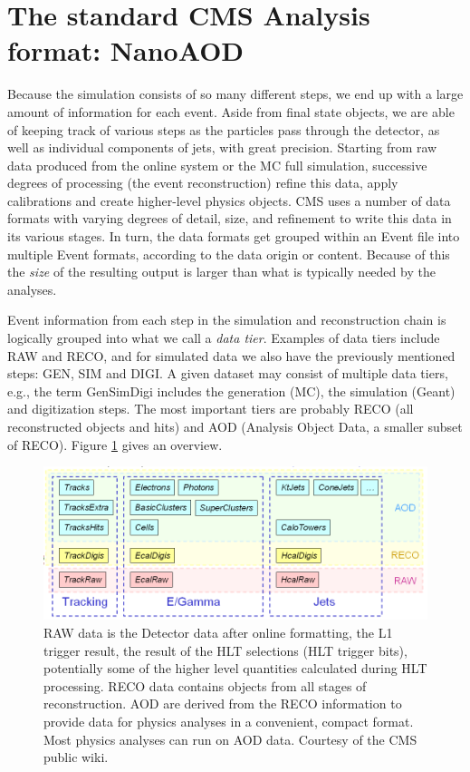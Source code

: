 \section{The standard CMS Analysis format: NanoAOD}\label{sec:nanoaod}

Because the simulation consists of so many different steps, we end up with a large amount of information for each event. Aside from final state objects, we are able of keeping track of various steps as the particles pass through the detector, as well as individual components of jets, with great precision. Starting from raw data produced from the online system or the MC full simulation, successive degrees of processing (the event reconstruction) refine this data, apply calibrations and create higher-level physics objects. CMS uses a number of data formats with varying degrees of detail, size, and refinement to write this data in its various stages. In turn, the data formats get grouped within an Event file into multiple Event formats, according to the data origin or content. Because of this the \emph{size} of the resulting output is larger than what is typically needed by the analyses.

Event information from each step in the simulation and reconstruction chain is logically grouped into what we call a \emph{data tier}. Examples of data tiers include RAW and RECO, and for simulated data we also have the previously mentioned steps: GEN, SIM and DIGI. A given dataset may consist of multiple data tiers, e.g., the term GenSimDigi includes the generation (MC), the simulation (Geant) and digitization steps. The most important tiers are probably RECO (all reconstructed objects and hits) and AOD (Analysis Object Data, a smaller subset of RECO). Figure \ref{fig:datatier} gives an overview. 

\begin{figure}
    \centering
     \includegraphics[width=\columnwidth]{gfx/ch2/whats_in_aod_reco.png}
    \caption[Data Tiers]{RAW data is the Detector data after online formatting, the L1 trigger result, the result of the HLT selections (HLT trigger bits), potentially some of the higher level quantities calculated during HLT processing. RECO data contains objects from all stages of reconstruction. AOD are derived from the RECO information to provide data for physics analyses in a convenient, compact format. Most physics analyses can run on AOD data. Courtesy of the CMS public wiki.}
    \label{fig:datatier}
\end{figure}

